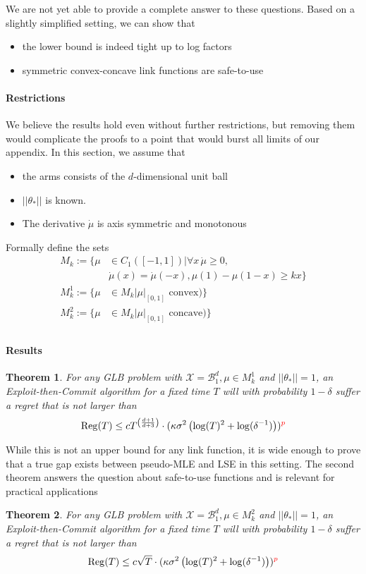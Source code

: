 \documentclass[twoside]{article} \usepackage{aistats2017}
\newtheorem{theorem}{Theorem}
\begin{document}
We are not yet able to provide a complete answer to these questions. 
Based on a slightly simplified setting, we can show that
\begin{itemize}
\item the lower bound is indeed tight up to log factors
\item symmetric convex-concave link functions are safe-to-use
\end{itemize}

\paragraph{Restrictions}
We believe the results hold even without further restrictions, but removing them would complicate the proofs to a point that would burst all limits of our appendix.
In this section, we assume that
\begin{itemize}
\item the arms consists of the $d$-dimensional unit ball
\item $||\theta_*||$ is known.
\item The derivative $\dot{\mu}$ is axis symmetric and monotonous
\end{itemize}
Formally define the sets
\begin{align*}
M_k := \{\mu &\in C_1([-1,1]) | \forall x \,\dot{\mu}\geq0,\\
&\dot{\mu}(x) = \dot{\mu}(-x), \mu(1)-\mu(1-x)\geq k x\}\\
M_k^1 := \{\mu &\in M_k | \mu|_{[0,1]} \mbox{ convex})\}\\
M_k^2 := \{\mu &\in M_k | \mu|_{[0,1]} \mbox{ concave})\}
\end{align*}
\begin{align*}
\end{align*}
\paragraph{Results} 
\begin{theorem}
For any GLB problem with $\mathcal{X}=\mathcal{B}^{d}_1, \mu\in M_k^1$ and $||\theta_*||=1$, an Exploit-then-Commit algorithm for a fixed time $T$ will with probability $1-\delta$ suffer a regret that is not larger than 
$$
\operatorname{Reg}(T) \leq c T^{\left(\frac{d+1}{d+3}\right)}\cdot(\kappa\sigma^2\left(\log(T)^2+\log(\delta^{-1})\right))\color{red}^p\color{black}
$$
\end{theorem}
While this is not an upper bound for any link function, it is wide enough to prove that a true gap exists between pseudo-MLE and LSE in this setting. The second theorem answers the question about safe-to-use functions and is relevant for practical applications
\begin{theorem}
For any GLB problem with $\mathcal{X}=\mathcal{B}^{d}_1, \mu\in M_k^2$ and $||\theta_*||=1$, an Exploit-then-Commit algorithm for a fixed time $T$ will with probability $1-\delta$ suffer a regret that is not larger than
$$
\operatorname{Reg}(T) \leq c \sqrt{T}\cdot(\kappa\sigma^2\left(\log(T)^2+\log(\delta^{-1})\right))\color{red}^p\color{black}
$$
\end{theorem}
\end{document}
